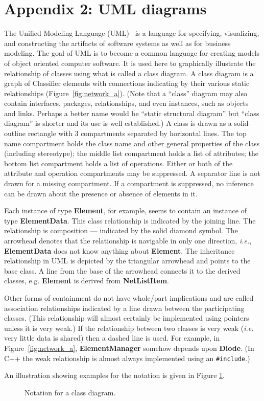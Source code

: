 \section*{Appendix 2: UML diagrams}

The Unified Modeling Language (UML)~\cite{rational,uml_tut} is a
language for specifying, visualizing, and constructing the artifacts
of software systems as well as for business modeling. The goal of UML
is to become a common language for creating models of object oriented
computer software.  It is used here to graphically illustrate the
relationship of classes using what is called a class diagram.  A class
diagram is a graph of Classifier elements with connections indicating
by their various static relationships (Figure~\ref{fig:network_a}). (Note
that a ``class'' diagram may also contain interfaces, packages,
relationships, and even instances, such as objects and links. Perhaps
a better name would be ``static structural diagram'' but ``class
diagram'' is shorter and its use is well established.)  A class is
drawn as a solid-outline rectangle with 3 compartments separated by
horizontal lines. The top name compartment holds the class name and
other general properties of the class (including stereotype); the
middle list compartment holds a list of attributes; the bottom list
compartment holds a list of operations.  Either or both of the
attribute and operation compartments may be suppressed. A separator
line is not drawn for a missing compartment. If a compartment is
suppressed, no inference can be drawn about the presence or absence of
elements in it.

Each instance of type {\bf Element}, for example, seems to contain an
instance of type {\bf ElementData}.  This class relationship is
indicated by the joining line.  The relationship is composition ---
indicated by the solid diamond symbol.  The arrowhead denotes that the
relationship is navigable in only one direction, \emph{i.e.}, {\bf
ElementData} does not know anything about {\bf Element}.  The
inheritance relationship in UML is depicted by the triangular
arrowhead and points to the base class.  A line from the base of the
arrowhead connects it to the derived classes, e.g. {\bf Element} is
derived from {\bf NetListItem}.

Other forms of containment do not have whole/part implications and are
called association relationships indicated by a line drawn between the
participating classes. (This relationship will almost certainly be
implemented using pointers unless it is very weak.)  If the
relationship between two classes is very weak (\emph{i.e.} very
little data is shared) then a dashed line is used.  For example, in
Figure~\ref{fig:network_a}, {\bf ElementManager} somehow depends upon {\bf
Diode}.  (In C++ the weak relationship is almost always implemented
using an {\tt \#include}.)

An illustration showing examples for the notation is given in
Figure \ref{fig:classdiag_ex}.

%
\begin{figure}[htpb]
\centerline{\epsfxsize=13cm }
\caption{Notation for a class diagram.}
\label{fig:classdiag_ex}
\end{figure}
%




